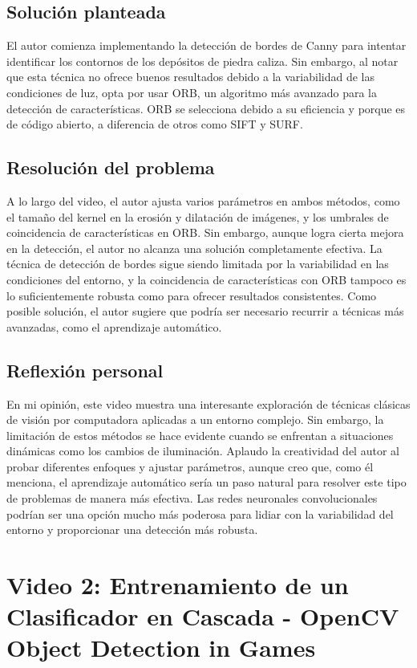 \documentclass{article}
\begin{document}
\subsection*{Solución planteada}
El autor comienza implementando la detección de bordes de Canny para intentar identificar los contornos de los depósitos de piedra caliza. Sin embargo, al notar que esta técnica no ofrece buenos resultados debido a la variabilidad de las condiciones de luz, opta por usar ORB, un algoritmo más avanzado para la detección de características. ORB se selecciona debido a su eficiencia y porque es de código abierto, a diferencia de otros como SIFT y SURF.

\subsection*{Resolución del problema}
A lo largo del video, el autor ajusta varios parámetros en ambos métodos, como el tamaño del kernel en la erosión y dilatación de imágenes, y los umbrales de coincidencia de características en ORB. Sin embargo, aunque logra cierta mejora en la detección, el autor no alcanza una solución completamente efectiva. La técnica de detección de bordes sigue siendo limitada por la variabilidad en las condiciones del entorno, y la coincidencia de características con ORB tampoco es lo suficientemente robusta como para ofrecer resultados consistentes. Como posible solución, el autor sugiere que podría ser necesario recurrir a técnicas más avanzadas, como el aprendizaje automático.

\subsection*{Reflexión personal}
En mi opinión, este video muestra una interesante exploración de técnicas clásicas de visión por computadora aplicadas a un entorno complejo. Sin embargo, la limitación de estos métodos se hace evidente cuando se enfrentan a situaciones dinámicas como los cambios de iluminación. Aplaudo la creatividad del autor al probar diferentes enfoques y ajustar parámetros, aunque creo que, como él menciona, el aprendizaje automático sería un paso natural para resolver este tipo de problemas de manera más efectiva. Las redes neuronales convolucionales podrían ser una opción mucho más poderosa para lidiar con la variabilidad del entorno y proporcionar una detección más robusta.

\section*{Video 2: Entrenamiento de un Clasificador en Cascada - OpenCV Object Detection in Games}
\end{document}
